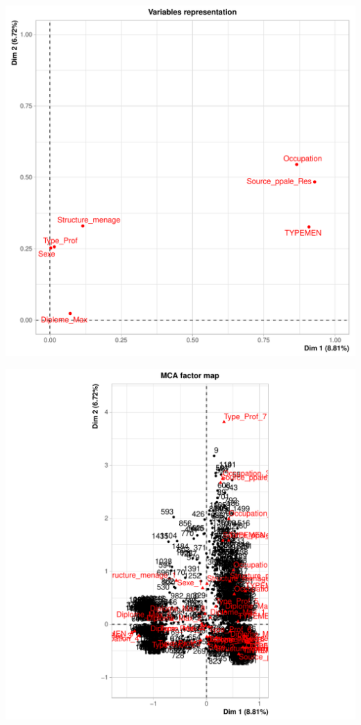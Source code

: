 \documentclass[11pt,a4paper, x11names]{article}\usepackage[]{graphicx}\usepackage[]{color}
\makeatletter
\def\maxwidth{ %
  \ifdim\Gin@nat@width>\linewidth
    \linewidth
  \else
    \Gin@nat@width
  \fi
}
\newenvironment{knitrout}{}{} %
\makeatother
\begin{document}
\begin{knitrout}
\includegraphics[width=\maxwidth]{figure/unnamed-chunk-9-3} 

\includegraphics[width=\maxwidth]{figure/unnamed-chunk-9-4} 
\end{knitrout}
\end{document}
